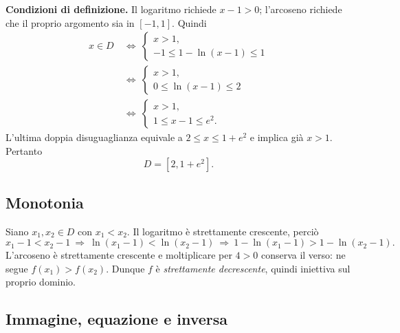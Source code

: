 \begin{svolgimento}
\textbf{Condizioni di definizione.} Il logaritmo richiede $x-1>0$; l'arcoseno richiede che il proprio argomento sia in $[-1,1]$. Quindi
\begin{align*}
x\in D
&\ \Longleftrightarrow\
\begin{cases}x>1,\\-1\le1-\ln(x-1)\le1\end{cases}\\
&\ \Longleftrightarrow\
\begin{cases}x>1,\\0\le\ln(x-1)\le2\end{cases}\\
&\ \Longleftrightarrow\
\begin{cases}x>1,\\1\le x-1\le e^2.\end{cases}
\end{align*}
L'ultima doppia disuguaglianza equivale a $2\le x\le1+e^2$ e implica già $x>1$. Pertanto
\[
\boxed{D=[2,1+e^2]}.
\]
\end{svolgimento}

\subsection{Monotonia}

\begin{svolgimento}
Siano $x_1,x_2\in D$ con $x_1<x_2$. Il logaritmo è strettamente crescente, perciò
\[
x_1-1<x_2-1
\ \Longrightarrow\ \ln(x_1-1)<\ln(x_2-1)
\ \Longrightarrow\ 1-\ln(x_1-1)>1-\ln(x_2-1).
\]
L'arcoseno è strettamente crescente e moltiplicare per $4>0$ conserva il verso: ne segue $f(x_1)>f(x_2)$. Dunque $f$ è \emph{strettamente decrescente}, quindi iniettiva sul proprio dominio.

\end{svolgimento}


\subsection{Immagine, equazione e inversa}

